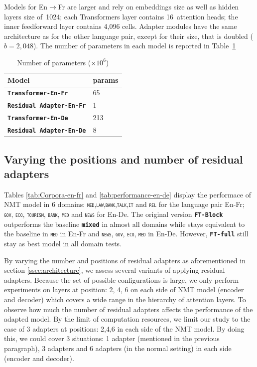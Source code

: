 \documentclass[11pt,a4paper]{article}
\newcommand{\fyTodo}[1]{\Todo[FY:]{\textcolor{orange}{#1}}}
\newcommand{\domain}[1]{\texttt{\textsc{#1}}}
\newcommand{\system}[1]{\texttt{\textbf{#1}}}
\begin{document}
Models for En$\rightarrow{}$Fr are larger and rely on embeddings size as well as hidden layers size of~1024; each Transformers layer contains 16~attention heads; the inner feedforward layer contains 4,096 cells. Adapter modules have the same architecture as for the other language pair, except for their size, that is doubled ($b=2,048$). The number of parameters in each model is reported in Table~\ref{tab:params}

\begin{table}[htbp]
  \centering
  \begin{tabular}{|l|l|} \hline
    Model & params \\ \hline 
    \system{Transformer-En-Fr}  & 65 \\
    \system{Residual Adapter-En-Fr} & 1 \\
    \system{Transformer-En-De}  & 213 \\
    \system{Residual Adapter-En-De} & 8 \\
     \hline
  \end{tabular}
  \caption{Number of parameters ($\times 10^6$)}
  \label{tab:params}
\end{table}

\subsection{Varying the positions and number of residual adapters}
Tables \ref{tab:Corpora-en-fr} and \ref{tab:performance-en-de} display the performace of NMT model in 6 domains: \domain{med},\domain{law},\domain{bank},\domain{talk},\domain{it} and \domain{rel} for the language pair En-Fr; \domain{gov}, \domain{eco}, \domain{tourism}, \domain{bank}, \domain{med} and \domain{news} for En-De. The original version \system{FT-Block} outperforms the baseline \system{mixed} in almost all domains while stays equivalent to the baseline in \domain{med} in En-Fr and \domain{news}, \domain{gov}, \domain{eco}, \domain{med} in En-De. However, \system{FT-full} still stay as best model in all domain tests.

By varying the number and positions of residual adapters as aforementioned in section \ref{ssec:architecture}, we assess several variants of applying residual adapters. \fyTodo{Fix style here} Because the set of possible configurations is large, we only perform experiments on layers at position: 2, 4, 6 on each side of NMT model (encoder and decoder) which covers a wide range in the hierarchy of attention layers. To observe how much the number of residual adapters affects the performance of the adapted model. By the limit of computation resources, we limit our study to the case of 3 adapters at positions: 2,4,6 in each side of the NMT model. By doing this, we could cover 3 situations: 1 adapter (mentioned in the previous paragraph), 3 adapters and 6 adapters (in the normal setting) in each side (encoder and decoder).\fyTodo{We have 12 layers, have we not ?}
\end{document}
